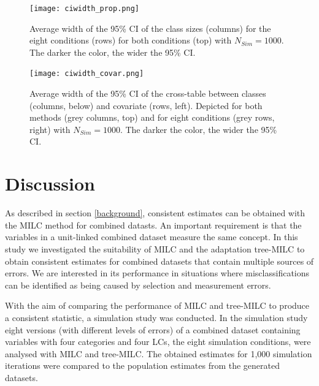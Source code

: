 \documentclass[a4paper, 11pt]{article} %
\begin{document}




\begin{figure}[h]
    \centering
    \texttt{[image: ciwidth\_prop.png]}
     \caption{Average width of the 95\% CI of the class sizes (columns) for the eight conditions (rows) for both conditions (top) with $N_{Sim} = 1000$. The darker the color, the wider the 95\% CI.}
     \label{fig:ciwidthprop}
\end{figure}

\begin{figure}[h]
    \centering
    \texttt{[image: ciwidth\_covar.png]}
     \caption{Average width of the 95\% CI of the cross-table between classes (columns, below) and covariate (rows, left). Depicted for both methods (grey columns, top) and for eight conditions (grey rows, right) with $N_{Sim} = 1000$. The darker the color, the wider the 95\% CI.}
     \label{fig:ciwidthcovar}
\end{figure}

\section{Discussion}
As described in section \ref{background}, consistent estimates can be obtained with the MILC method for combined datasts. An important requirement is that the variables in a unit-linked combined dataset measure the same concept. In this study we investigated the suitability of MILC and the adaptation tree-MILC to obtain consistent estimates for combined datasets that contain multiple sources of errors. We are interested in its performance in situations where misclassifications can be identified as being caused by selection and measurement errors. 

With the aim of comparing the performance of MILC and tree-MILC to produce a consistent statistic, a simulation study was conducted. In the simulation study eight versions (with different levels of errors) of a combined dataset containing variables with four categories and four LCs, the eight simulation conditions, were analysed with MILC and tree-MILC. The obtained estimates for 1,000 simulation iterations were compared to the population estimates from the generated datasets. 
\end{document}

